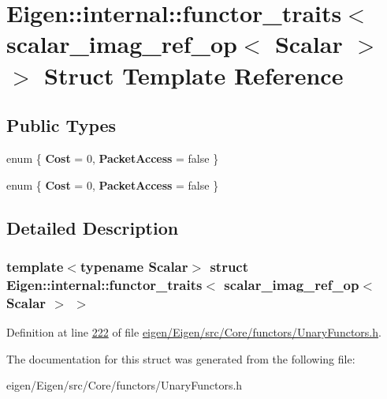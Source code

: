 \hypertarget{struct_eigen_1_1internal_1_1functor__traits_3_01scalar__imag__ref__op_3_01_scalar_01_4_01_4}{}\section{Eigen\+:\+:internal\+:\+:functor\+\_\+traits$<$ scalar\+\_\+imag\+\_\+ref\+\_\+op$<$ Scalar $>$ $>$ Struct Template Reference}
\label{struct_eigen_1_1internal_1_1functor__traits_3_01scalar__imag__ref__op_3_01_scalar_01_4_01_4}
\subsection*{Public Types}
\begin{DoxyCompactItemize}
\item 
\mbox{\label{struct_eigen_1_1internal_1_1functor__traits_3_01scalar__imag__ref__op_3_01_scalar_01_4_01_4_ac2dab49efd9c1db228b86c5823261791}} 
enum \{ {\bfseries Cost} = 0, 
{\bfseries Packet\+Access} = false
 \}
\item 
\mbox{\label{struct_eigen_1_1internal_1_1functor__traits_3_01scalar__imag__ref__op_3_01_scalar_01_4_01_4_abae696a4d9abad25af180cff1e22a912}} 
enum \{ {\bfseries Cost} = 0, 
{\bfseries Packet\+Access} = false
 \}
\end{DoxyCompactItemize}


\subsection{Detailed Description}
\subsubsection*{template$<$typename Scalar$>$\newline
struct Eigen\+::internal\+::functor\+\_\+traits$<$ scalar\+\_\+imag\+\_\+ref\+\_\+op$<$ Scalar $>$ $>$}



Definition at line \hyperlink{eigen_2_eigen_2src_2_core_2functors_2_unary_functors_8h_source_l00222}{222} of file \hyperlink{eigen_2_eigen_2src_2_core_2functors_2_unary_functors_8h_source}{eigen/\+Eigen/src/\+Core/functors/\+Unary\+Functors.\+h}.



The documentation for this struct was generated from the following file\+:\begin{DoxyCompactItemize}
\item 
eigen/\+Eigen/src/\+Core/functors/\+Unary\+Functors.\+h\end{DoxyCompactItemize}
